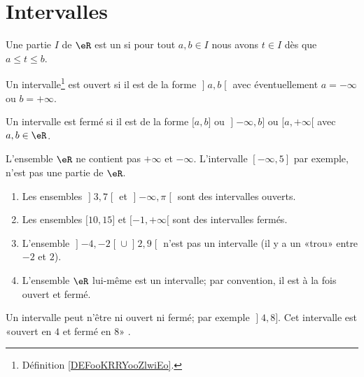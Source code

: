 
\section{Intervalles}

\begin{definition}[Intervalle]      \label{DEFooKRRYooZlwiEo}
    Une partie \( I\) de \( \eR\) est un  si pour tout \( a,b\in I\) nous avons \( t\in I\) dès que \( a\leq t\leq b\).
\end{definition}

\begin{proposition}     \label{PROPooJJRZooACUmWN}
Un intervalle\footnote{Définition \ref{DEFooKRRYooZlwiEo}.} est ouvert si il est de la forme \( \mathopen] a , b \mathclose[\) avec éventuellement \( a=-\infty\) ou \( b=+\infty\).

        Un intervalle est fermé si il est de la forme \( \mathopen[ a , b \mathclose]\) ou \( \mathopen] -\infty , b \mathclose]\) ou \( \mathopen[ a , +\infty [\) avec \( a,b\in \eR\).
\end{proposition}

\begin{remark}
  L'ensemble $\eR$ ne contient pas $+\infty$ et $-\infty$. L'intervalle $[-\infty, 5]$ par exemple, n'est pas une partie de $\eR$.
\end{remark}

\begin{example}
    \begin{enumerate}
        \item
        Les ensembles \( \mathopen] 3 , 7 \mathclose[\) et \( \mathopen] -\infty , \pi \mathclose[\) sont des intervalles ouverts.
        \item
            Les ensembles \( \mathopen[ 10 , 15 \mathclose]\) et \( \mathopen[ -1 , +\infty [\) sont des intervalles fermés.
        \item
        L'ensemble \( \mathopen] -4 , -2 \mathclose[\cup\mathopen] 2 , 9 \mathclose[\) n'est pas un intervalle (il y a un «trou» entre \(- 2\) et \( 2\)).
        \item
            L'ensemble \( \eR\) lui-même est un intervalle; par convention, il est à la fois ouvert et fermé.
    \end{enumerate}
Un intervalle peut n'être ni ouvert ni fermé; par exemple \( \mathopen] 4 , 8 \mathclose]\). Cet intervalle est «ouvert en \( 4\) et fermé en \( 8\)» .
\end{example}


